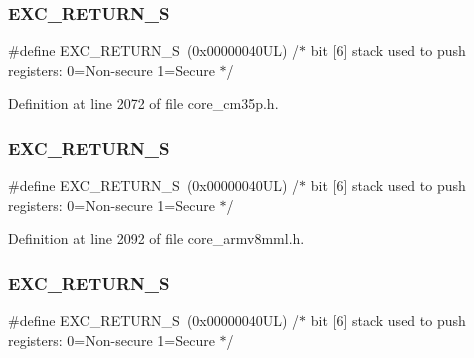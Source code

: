 \subsubsection{\texorpdfstring{E\+X\+C\+\_\+\+R\+E\+T\+U\+R\+N\+\_\+S}{EXC\_RETURN\_S}\hspace{0.1cm}{\footnotesize\ttfamily [3/5]}}
{\footnotesize\ttfamily \#define E\+X\+C\+\_\+\+R\+E\+T\+U\+R\+N\+\_\+S~(0x00000040\+U\+L)     /$\ast$ bit \mbox{[}6\mbox{]} stack used to push registers\+: 0=\+Non-\/secure 1=\+Secure          $\ast$/}



Definition at line 2072 of file core\+\_\+cm35p.\+h.

\mbox{\label{group___c_m_s_i_s___core___n_v_i_c_functions_ga88711355d0196b1ffeb18c33e2c95360}} 
\subsubsection{\texorpdfstring{E\+X\+C\+\_\+\+R\+E\+T\+U\+R\+N\+\_\+S}{EXC\_RETURN\_S}\hspace{0.1cm}{\footnotesize\ttfamily [4/5]}}
{\footnotesize\ttfamily \#define E\+X\+C\+\_\+\+R\+E\+T\+U\+R\+N\+\_\+S~(0x00000040\+U\+L)     /$\ast$ bit \mbox{[}6\mbox{]} stack used to push registers\+: 0=\+Non-\/secure 1=\+Secure          $\ast$/}



Definition at line 2092 of file core\+\_\+armv8mml.\+h.

\mbox{\label{group___c_m_s_i_s___core___n_v_i_c_functions_ga88711355d0196b1ffeb18c33e2c95360}} 
\subsubsection{\texorpdfstring{E\+X\+C\+\_\+\+R\+E\+T\+U\+R\+N\+\_\+S}{EXC\_RETURN\_S}\hspace{0.1cm}{\footnotesize\ttfamily [5/5]}}
{\footnotesize\ttfamily \#define E\+X\+C\+\_\+\+R\+E\+T\+U\+R\+N\+\_\+S~(0x00000040\+U\+L)     /$\ast$ bit \mbox{[}6\mbox{]} stack used to push registers\+: 0=\+Non-\/secure 1=\+Secure          $\ast$/}



